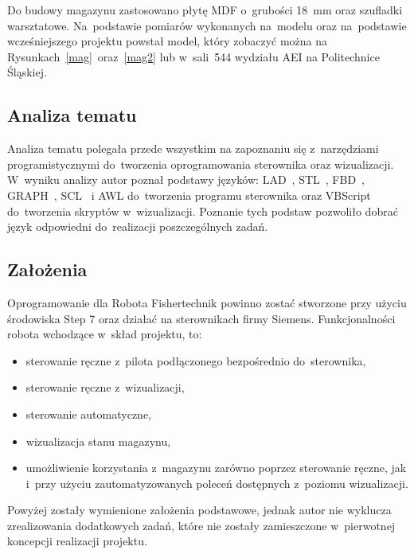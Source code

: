Do budowy magazynu zastosowano płytę MDF o~grubości 18~mm oraz szufladki warsztatowe. Na~podstawie pomiarów wykonanych na~modelu oraz na~podstawie wcześniejszego projektu powstał model, który zobaczyć można na Rysunkach~\ref{mag}~oraz~\ref{mag2} lub w~sali~544 wydziału AEI na Politechnice Śląskiej.

\subsection{Analiza tematu}
Analiza tematu polegała przede wszystkim na zapoznaniu się z~narzędziami programistycznymi do~tworzenia oprogramowania sterownika oraz wizualizacji.
W~wyniku analizy autor poznał podstawy języków: LAD~\cite{step1,step2,step3}, STL~\cite{step1,step2,step3}, FBD~\cite{step1,step2,step3}, GRAPH~\cite{step3}, SCL~\cite{scl1,scl2,scl3} i AWL do~tworzenia programu sterownika oraz VBScript do~tworzenia skryptów w~wizualizacji. Poznanie tych podstaw pozwoliło dobrać język odpowiedni do~realizacji poszczególnych zadań.

\subsection{Założenia}
Oprogramowanie dla Robota Fishertechnik powinno zostać stworzone przy użyciu środowiska Step 7 oraz działać na sterownikach firmy Siemens. Funkcjonalności robota wchodzące w~skład projektu, to:
\begin{itemize}
\item sterowanie ręczne z~pilota podłączonego bezpośrednio do~sterownika,
\item sterowanie ręczne z~wizualizacji,
\item sterowanie automatyczne, 
\item wizualizacja stanu magazynu,
\item umożliwienie korzystania z~magazynu zarówno poprzez sterowanie ręczne, jak i~przy użyciu zautomatyzowanych poleceń dostępnych z~poziomu wizualizacji.
\end{itemize}
\indent
\indent Powyżej zostały wymienione założenia podstawowe, jednak autor nie wyklucza zrealizowania dodatkowych zadań, które nie zostały zamieszczone w~pierwotnej koncepcji realizacji projektu.

